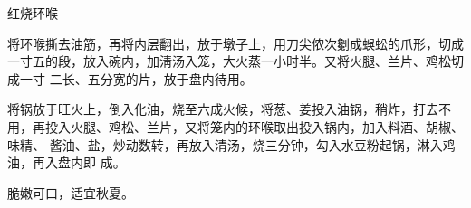 \begin{recipe}{红烧环喉}

\ingredients


\preparation

\step 将环喉撕去油筋，再将内层翻出，放于墩子上，用刀尖侬次劖成蜈蚣的爪形，切成
一寸五的段，放入碗内，加淸汤入笼，大火蒸一小时半。又将火腿、兰片、鸡松切成一寸
二长、五分宽的片，放于盘内待用。

\step 将锅放于旺火上，倒入化油，烧至六成火候，将葱、姜投入油锅，稍炸，打去不
用，再投入火腿、鸡松、兰片，又将笼内的环喉取出投入锅内，加入料酒、胡椒、味精、
酱油、盐，炒动数转，再放入清汤，烧三分钟，勾入水豆粉起锅，淋入鸡油，再入盘内即
成。

\features

脆嫩可口，适宜秋夏。

\end{recipe}

